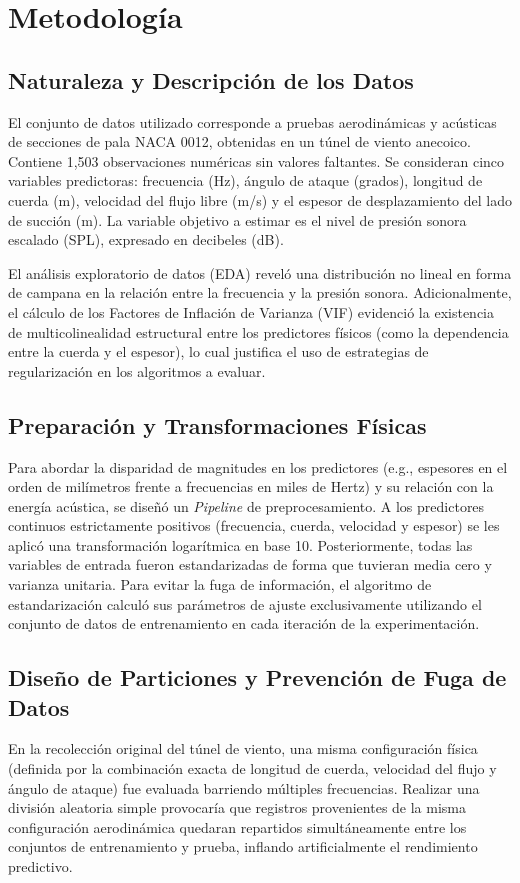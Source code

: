 \documentclass[pdflatex,sn-mathphys-num]{sn-jnl}%
\theoremstyle{thmstyleone}
\theoremstyle{thmstyletwo}
\theoremstyle{thmstylethree}
\begin{document}
\section{Metodología}\label{sec2}

\subsection{Naturaleza y Descripción de los Datos}
El conjunto de datos utilizado corresponde a pruebas aerodinámicas y acústicas de secciones de pala NACA 0012, obtenidas en un túnel de viento anecoico. Contiene 1,503 observaciones numéricas sin valores faltantes. Se consideran cinco variables predictoras: frecuencia (Hz), ángulo de ataque (grados), longitud de cuerda (m), velocidad del flujo libre (m/s) y el espesor de desplazamiento del lado de succión (m). La variable objetivo a estimar es el nivel de presión sonora escalado (SPL), expresado en decibeles (dB).

El análisis exploratorio de datos (EDA) reveló una distribución no lineal en forma de campana en la relación entre la frecuencia y la presión sonora. Adicionalmente, el cálculo de los Factores de Inflación de Varianza (VIF) evidenció la existencia de multicolinealidad estructural entre los predictores físicos (como la dependencia entre la cuerda y el espesor), lo cual justifica el uso de estrategias de regularización en los algoritmos a evaluar.

\subsection{Preparación y Transformaciones Físicas}
Para abordar la disparidad de magnitudes en los predictores (e.g., espesores en el orden de milímetros frente a frecuencias en miles de Hertz) y su relación con la energía acústica, se diseñó un \textit{Pipeline} de preprocesamiento. A los predictores continuos estrictamente positivos (frecuencia, cuerda, velocidad y espesor) se les aplicó una transformación logarítmica en base 10. Posteriormente, todas las variables de entrada fueron estandarizadas de forma que tuvieran media cero y varianza unitaria. Para evitar la fuga de información, el algoritmo de estandarización calculó sus parámetros de ajuste exclusivamente utilizando el conjunto de datos de entrenamiento en cada iteración de la experimentación.

\subsection{Diseño de Particiones y Prevención de Fuga de Datos}
En la recolección original del túnel de viento, una misma configuración física (definida por la combinación exacta de longitud de cuerda, velocidad del flujo y ángulo de ataque) fue evaluada barriendo múltiples frecuencias. Realizar una división aleatoria simple provocaría que registros provenientes de la misma configuración aerodinámica quedaran repartidos simultáneamente entre los conjuntos de entrenamiento y prueba, inflando artificialmente el rendimiento predictivo.
\end{document}
